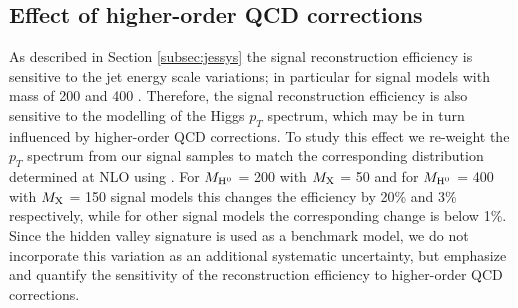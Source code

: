 
\subsection{Effect of higher-order QCD corrections}
\label{subsec:isr}

As described in Section \ref{subsec:jessys} the signal reconstruction efficiency is sensitive to the jet energy
scale variations; in particular for signal models with \Higgs mass of 200 \GeV and 400 \GeV. 
Therefore, the signal reconstruction efficiency is also sensitive to the modelling of
 the Higgs $p_T$ spectrum, which may be in turn influenced by higher-order QCD corrections. 
To study this effect
we re-weight the \PYTHIA \Higgs $p_T$ spectrum from our signal samples to match the corresponding distribution
determined at NLO using \POWHEG \cite{Bagnaschi:2011tu}. For $M_{\mathrm{H}^{0}}$ = 200 \GeV with $M_{\mathrm{X}}$ = 50 \GeV and for $M_{\mathrm{H}^{0}}$ = 400 \GeV 
with $M_{\mathrm{X}}$ = 150 \GeV signal models this changes the efficiency by 20\% and 3\% respectively, while for
other signal models the corresponding change is below 1\%. 
Since the hidden valley signature is used as a benchmark
model, we do not incorporate this variation as an additional systematic uncertainty, but emphasize and quantify
the sensitivity of the reconstruction efficiency to higher-order QCD corrections.  

